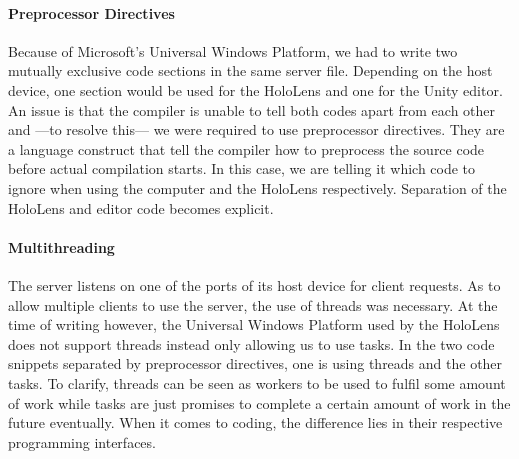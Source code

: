 
\paragraph{Preprocessor Directives}
Because of Microsoft's Universal Windows Platform, we had to write two  mutually exclusive code sections in the same server file. Depending on the host device, one section would be used for the HoloLens and one for the Unity editor. An issue is that the compiler is unable to tell both codes apart from each other and ---to resolve this--- we  were required to use preprocessor directives. 
They are a language construct that tell the compiler how to preprocess the source code before actual compilation starts. In this case, we are telling it which code to ignore when using the computer and the HoloLens respectively. Separation of the HoloLens and editor code becomes explicit. 




\paragraph{Multithreading}
The server listens on one of the ports of its host device for client requests. As to allow multiple clients to use the server, the use of threads was necessary. At the time of writing however, the Universal Windows Platform used by the HoloLens does not support threads instead only allowing us to use tasks. In the two code snippets separated by preprocessor directives, one is using threads and the other tasks.
To clarify, threads can be seen as workers to be used to fulfil some amount of work while tasks are just promises to complete a certain amount of work in the future eventually. When it comes to coding, the difference lies in their respective programming interfaces.

